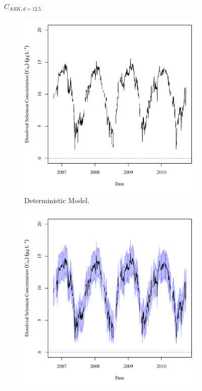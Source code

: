 \begin{linenumbers}
\subfiguremid
\begin{landscape}
	\begin{figure}
		$ C_{ARK,d=12.5} $
		\begin{subfigure}{0.7\textwidth}
			\centering
			\includegraphics[width=\tableCustomSize]{"Figures/Results_USR/Deterministic/c TS HOL"}
			\caption{Deterministic Model.}
		\end{subfigure}%
		\begin{subfigure}{0.7\textwidth}
			\centering
			\includegraphics[width=\tableCustomSize]{"Figures/Results_USR/Stochastic/c TS HOL"}

\end{subfigure}
\end{figure}
\end{landscape}
\end{linenumbers}
